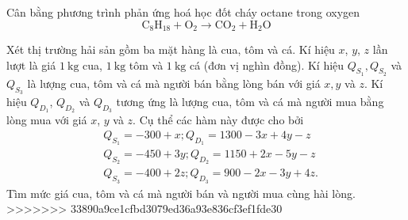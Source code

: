 \begin{bt}
\begin{bt}
{}
	\end{bt}
\begin{bt}%
	Cân bằng phương trình phản ứng hoá học đốt cháy octane trong oxygen
	$$
	\mathrm{C}_8 \mathrm{H}_{18}+\mathrm{O}_2 \rightarrow \mathrm{CO}_2+\mathrm{H}_2 \mathrm{O}
	$$
	\end{bt}
\begin{bt}%
 Xét thị trường hải sản gồm ba mặt hàng là cua, tôm và cá. Kí hiệu $x$, $y$, $z$ lần lượt là giá $1 \mathrm{~kg}$ cua, $1 \mathrm{~kg}$ tôm và $1 \mathrm{~kg}$ cá (đơn vị nghìn đồng). Kí hiệu $Q_{S_1}, Q_{S_2}$ và $Q_{S_3}$ là lượng cua, tôm và cá mà người bán bằng lòng bán với giá $x, y$ và $z$. Kí hiệu $Q_{D_1}$, $Q_{D_2}$ và $Q_{D_3}$ tương ứng là lượng cua, tôm và cá mà người mua bằng lòng mua với giá $x$, $y$ và $z$. Cụ thể các hàm này được cho bởi
	$$
	\begin{aligned}
		&Q_{S_1}=-300+x ; Q_{D_1}=1300-3 x+4 y-z \\
		&Q_{S_2}=-450+3 y ; Q_{D_2}=1150+2 x-5 y-z \\
		&Q_{S_3}=-400+2 z ; Q_{D_3}=900-2 x-3 y+4 z.
	\end{aligned}
	$$
	Tìm mức giá cua, tôm và cá mà người bán và người mua cùng hài lòng.
>>>>>>> 33890a9ce1cfbd3079ed36a93e836cf3ef1fde30
	\end{bt}